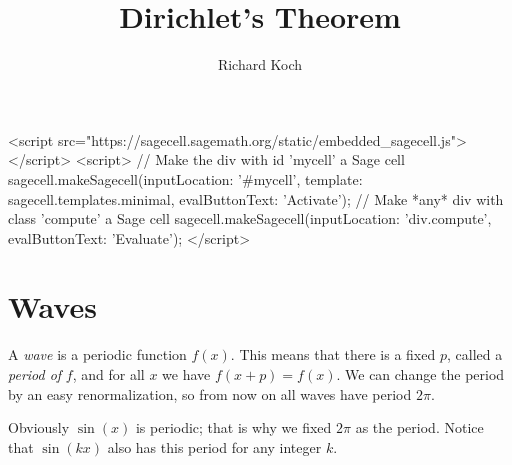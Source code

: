 \documentclass[11pt, oneside]{article}   	%
\title{Dirichlet's Theorem}
\author{Richard Koch}
\begin{document}

\ifx\HCode\undefined
\else
    {\ifvmode\IgnorePar\fi\EndP\NoFonts\hfill\break }
    {\EndNoFonts }
  \fi

 \ifx\HCode\undefined
 \else
 \begin{html}
 <script src="https://sagecell.sagemath.org/static/embedded_sagecell.js"></script>
<script>
    // Make the div with id 'mycell' a Sage cell
    sagecell.makeSagecell({inputLocation:  '#mycell',
                            template:       sagecell.templates.minimal,
                           evalButtonText: 'Activate'});
    // Make *any* div with class 'compute' a Sage cell
    sagecell.makeSagecell({inputLocation: 'div.compute',
                           evalButtonText: 'Evaluate'});
    </script>
 \end{html}
 \fi
 
 \maketitle
 
\section{Waves} 

A {\em wave} is a periodic function \(f(x)\). This means that there is a fixed \(p\), called a  {\em period of} \(f\), and for all \(x\) we have \(f(x + p) = f(x)\). We can change the period by an easy renormalization, so from now on all waves have period \(2 \pi\).

Obviously \(\sin(x)\) is periodic; that is why we fixed \(2 \pi\) as the period. Notice that \(\sin(kx)\) also has this period for any integer \(k\). 
\end{document}

